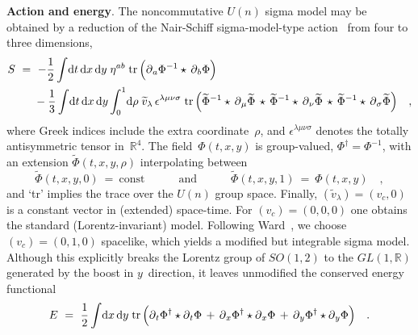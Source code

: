 \documentclass[a4paper,11pt]{article}
\numberwithin{equation}{section}
\def\eps{\epsilon}
\def\l{\lambda}
\def\m{\mu}
\def\n{\nu}
\def\r{\rho}
\def\s{\sigma}
\newcommand{\R}{\mathbb R}
\def\pa{\mbox{$\partial$}}
\def\diff{\mbox{d}}
\def\tr{{\rm tr}}
\newcommand{\Pht}{\widetilde{\Phi}}
\begin{document}
\noindent
{\bf Action and energy}.
The noncommutative $U(n)$ sigma model may be obtained by a reduction 
of the Nair-Schiff sigma-model-type action~\cite{NaS,losev} 
from four to three dimensions,
\begin{align}
S\ &=\ -\frac12\int\!\diff{t}\,\diff{x}\,\diff{y}\;\eta^{ab}\;
\tr\,\Bigl(\pa_a \Phi^{-1} \star\, \pa_b \Phi \Bigr) \nonumber\\
&\quad\ - \frac13\int\!\diff{t}\,\diff{x}\,\diff{y} \int_0^1\!\diff{\r}\;
\widetilde{v}_{\l}\,\eps^{\l\m\n\s}\;\tr\,\Bigl(
\Pht^{-1}\star\,\pa_{\m}\Pht\,\star\,
\Pht^{-1}\star\,\pa_{\n}\Pht\,\star\,
\Pht^{-1}\star\,\pa_{\s}\Pht \Bigr) \quad,
\label{NaSaction}
\end{align}
where Greek indices include the extra coordinate~$\r$,
and $\eps^{\l\m\n\s}$ denotes the totally antisymmetric tensor in~$\R^4$.
The field~$\Phi(t,x,y)$ is group-valued, $\Phi^\dagger=\Phi^{-1}$,
with an extension $\Pht(t,x,y,\r)$ interpolating between
\begin{equation}
\Pht(t,x,y,0)\ =\ \textrm{const} \qquad\quad\textrm{and}\qquad\quad
\Pht(t,x,y,1)\ =\ \Phi(t,x,y) \quad,
\end{equation}
and `tr' implies the trace over the $U(n)$ group space.
Finally, $(\widetilde{v}_{\l})=(v_c,0)$
is a constant vector in (extended) space-time. For $(v_c)=(0,0,0)$
one obtains the standard (Lorentz-invariant) model.
Following Ward~\cite{ward}, we choose $(v_c)=(0,1,0)$ spacelike,
which yields a modified but integrable sigma model.
Although this explicitly breaks the Lorentz group of $SO(1,2)$ to the
$GL(1,\R)$ generated by the boost in $y$~direction, it leaves unmodified the
conserved energy functional
\begin{equation} \label{energy}
E\ =\ \frac{1}{2}\int\!\diff{x}\,\diff{y}\;\tr\,
\Bigl(\pa_t \Phi^{\dagger} \star \pa_t \Phi \,+\,
 \pa_x \Phi^{\dagger} \star \pa_x \Phi \,+\,
 \pa_y \Phi^{\dagger} \star \pa_y \Phi \Bigr) \quad.
\end{equation}
\end{document}
